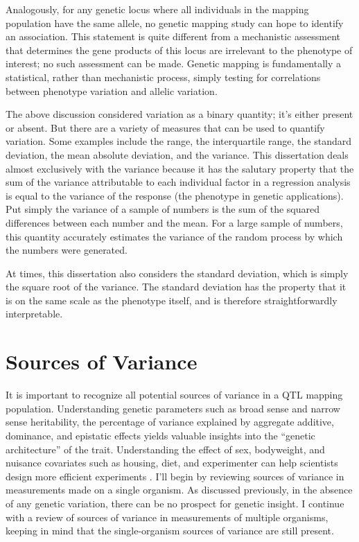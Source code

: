Analogously, for any genetic locus where all individuals in the mapping population have the same allele, no genetic mapping study can hope to identify an association.
This statement is quite different from a mechanistic assessment that determines the gene products of this locus are irrelevant to the phenotype of interest; no such assessment can be made.
Genetic mapping is fundamentally a statistical, rather than mechanistic process, simply testing for correlations between phenotype variation and allelic variation.

The above discussion considered variation as a binary quantity; it's either present or absent.
But there are a variety of measures that can be used to quantify variation.
Some examples include the range, the interquartile range, the standard deviation, the mean absolute deviation, and the variance.
This dissertation deals almost exclusively with the variance because it has the salutary property that the sum of the variance attributable to each individual factor in a regression analysis is equal to the variance of the response (the phenotype in genetic applications).
Put simply the variance of a sample of numbers is the sum of the squared differences between each number and the mean.
For a large sample of numbers, this quantity accurately estimates the variance of the random process by which the numbers were generated.

At times, this dissertation also considers the standard deviation, which is simply the square root of the variance.
The standard deviation has the property that it is on the same scale as the phenotype itself, and is therefore straightforwardly interpretable.

\section{Sources of Variance}

It is important to recognize all potential sources of variance in a QTL mapping population.
Understanding genetic parameters such as broad sense and narrow sense heritability, the percentage of variance explained by aggregate additive, dominance, and epistatic effects yields valuable insights into the ``genetic architecture'' of the trait.
Understanding the effect of sex, bodyweight, and nuisance covariates such as housing, diet, and experimenter can help scientists design more efficient experiments \citep{Nettleton2006,Datta2014}.
I'll begin by reviewing sources of variance in measurements made on a single organism.
As discussed previously, in the absence of any genetic variation, there can be no prospect for genetic insight.
I continue with a review of sources of variance in measurements of multiple organisms, keeping in mind that the single-organism sources of variance are still present.


